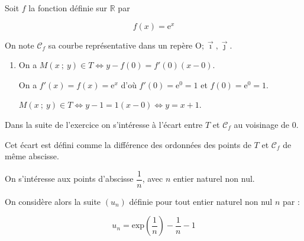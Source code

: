 \documentclass[10pt]{article}
\providecommand{\R}{\mathbb{R}}
\providecommand{\Oij}{\(\mathrm{O};\vec{\imath},\vec{\jmath}\)}
\begin{document}
Soit $f$ la fonction définie sur $\R$ par

\[f(x) = \text{e}^x\]

On note $\mathcal{C}_f$ sa courbe représentative dans un repère \Oij.

\medskip

\begin{enumerate}
\item 
On a $M(x~;~y) \in T \iff y - f(0) = f'(0)(x - 0)$.

On a $f'(x) = f(x) = \text{e}^x$ d'où $f'(0) = \text{e}^0  = 1$ et $f(0) = \text{e}^0  = 1$.

$M(x~;~y) \in T \iff y - 1 = 1 (x - 0) \iff y = x + 1$.
\end{enumerate}

Dans la suite de l'exercice on s'intéresse à l'écart entre $T$ et $\mathcal{C}_f$ au voisinage de $0$. 

Cet écart est défini comme la différence des ordonnées des points de $T$ et $\mathcal{C}_f$ de même abscisse.

On s'intéresse aux points d'abscisse $\dfrac{1}{n}$, avec $n$ entier naturel non nul.

On considère alors la suite $\left(u_n\right)$ définie pour tout entier naturel non nul $n$ par : 

\[u_n = \text{exp} \left(\dfrac{1}{n}\right) - \dfrac{1}{n} - 1\]
\end{document}
